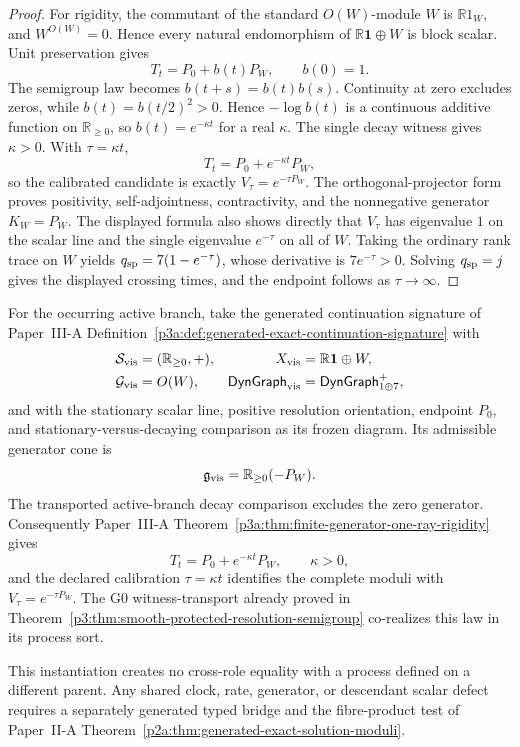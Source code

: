 \documentclass[12pt,a4paper]{article}
\begin{document}
\begin{proof}
For rigidity, the commutant of the standard \(O(W)\)-module \(W\) is
\(\mathbb R1_W\), and \(W^{O(W)}=0\).  Hence every natural endomorphism of
\(\mathbb R\mathbf1\oplus W\) is block scalar.  Unit preservation gives
\[
 T_t=P_0+b(t)P_W,
 \qquad b(0)=1.
\]
The semigroup law becomes \(b(t+s)=b(t)b(s)\).  Continuity at zero excludes
zeros, while \(b(t)=b(t/2)^2>0\).  Hence
\(-\log b(t)\) is a continuous additive function on
\(\mathbb R_{\ge0}\), so \(b(t)=e^{-\kappa t}\) for a real \(\kappa\).
The single decay witness gives \(\kappa>0\).  With \(\tau=\kappa t\),
\[
 T_t=P_0+e^{-\kappa t}P_W,
\]
so the calibrated candidate is exactly \(V_\tau=e^{-\tau P_W}\).  The
orthogonal-projector form proves positivity, self-adjointness, contractivity,
and the nonnegative generator \(K_W=P_W\).
The displayed formula also shows directly that \(V_\tau\) has eigenvalue
\(1\) on the scalar line and the single eigenvalue \(e^{-\tau}\) on all of
\(W\).  Taking the ordinary rank trace on \(W\) yields
\(q_{\rm sp}=7(1-e^{-\tau})\), whose derivative is
\(7e^{-\tau}>0\).  Solving \(q_{\rm sp}=j\) gives the displayed crossing
times, and the endpoint follows as \(\tau\to\infty\).
\end{proof}

\begin{corollary}
\label{p3c:cor:visibility-universal-continuation-instance}
For the occurring active branch, take the generated continuation signature of
Paper~III-A Definition~\ref{p3a:def:generated-exact-continuation-signature}
with
\[
\begin{aligned}
 \mathcal S_{\rm vis}&=(\mathbb R_{\ge0},+),&
 X_{\rm vis}&=\mathbb R\mathbf1\oplus W,\\
 \mathcal G_{\rm vis}&=O(W),&
 \mathsf{DynGraph}_{\rm vis}
   &=\mathsf{DynGraph}_{1\oplus7}^{+},
\end{aligned}
\]
and with the stationary scalar line, positive resolution orientation,
endpoint \(P_0\), and stationary-versus-decaying comparison as its frozen
diagram.  Its admissible generator cone is
\[
 \mathfrak g_{\rm vis}
 =\mathbb R_{\ge0}(-P_W).
\]
The transported active-branch decay comparison excludes the zero generator.
Consequently Paper~III-A
Theorem~\ref{p3a:thm:finite-generator-one-ray-rigidity} gives
\[
 T_t=P_0+e^{-\kappa t}P_W,
 \qquad \kappa>0,
\]
and the declared calibration \(\tau=\kappa t\) identifies the complete
moduli with \(V_\tau=e^{-\tau P_W}\).  The G0 witness-transport already proved
in Theorem~\ref{p3:thm:smooth-protected-resolution-semigroup} co-realizes this
law in its process sort.

This instantiation creates no cross-role equality with a process defined on a
different parent.  Any shared clock, rate, generator, or descendant scalar
defect requires a separately generated typed bridge and the fibre-product
test of Paper~II-A
Theorem~\ref{p2a:thm:generated-exact-solution-moduli}.
\end{corollary}
\end{document}
